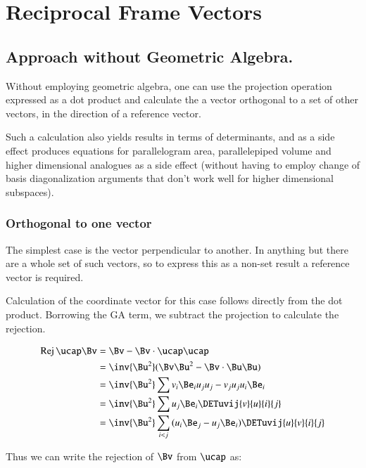 \chapter{Reciprocal Frame Vectors} 
\date{ March 29, 2008.  $RCSfile: reciprocalFrame.tex,v $ Last $Revision: 1.14 $ $Date: 2009/06/11 16:45:58 $ }

\section{Approach without Geometric Algebra. }

Without employing geometric algebra, one can use the projection
operation expressed as a dot product and calculate the a vector
orthogonal to a set of other vectors, in the direction of a reference
vector.

Such a calculation also yields  results in terms of determinants, and as a side
effect produces equations for
parallelogram area, parallelepiped volume and higher dimensional analogues as a side effect
(without having to employ change of basis diagonalization arguments that don't work well
for higher dimensional subspaces).

\subsection{Orthogonal to one vector }

The simplest case is the vector perpendicular to another.  In anything
but  there are a whole set of such vectors, so to express this as a
non-set result a reference vector is required.

Calculation of the coordinate vector for this case follows directly from
the dot product.  Borrowing the GA term, we subtract the projection
to calculate the rejection.

\begin{align*}
\Rej{\ucap}{\Bv}
&= \Bv - \Bv \cdot \ucap \ucap \\
&= \inv{\Bu^2}(\Bv\Bu^2 - \Bv \cdot \Bu \Bu) \\
&= \inv{\Bu^2}\sum{v_i\Be_i u_j u_j - v_j u_j u_i \Be_i} \\
&= \inv{\Bu^2}\sum{u_j\Be_i\DETuvij{v}{u}{i}{j}} \\
&= \inv{\Bu^2}\sum_{i<j}{(u_i \Be_j -u_j\Be_i)\DETuvij{u}{v}{i}{j}} \\
\end{align*}

Thus we can write the rejection of $\Bv$ from $\ucap$ as:


